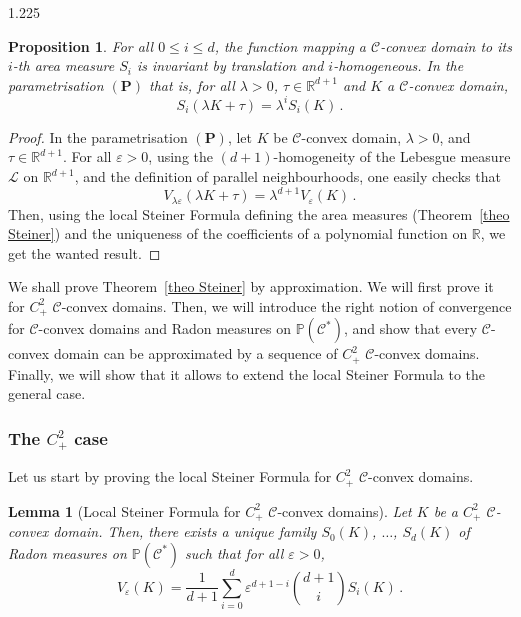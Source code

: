 \documentclass[reqno, a4paper]{amsart}
\numberwithin{equation}{section}
\numberwithin{figure}{section}
\newtheorem{lemma}[theorem]{Lemma}
\newtheorem{proposition}[theorem]{Proposition}
\theoremstyle{definition}
\theoremstyle{remark}
\newcommand{\R}{\mathbb{R}} %
\renewcommand{\P}{\mathbb{P}} %
\newcommand{\C}{\mathcal{C}} %
\begin{document}
\begin{spacing}{1.225}
\begin{proposition}
For all $0\leq i \leq d$, the function mapping a $\C$-convex domain to its $i$-th area measure $S_i$ is invariant by translation and $i$-homogeneous. In the parametrisation $(\mathbf{P})$ that is, for all $\lambda > 0$, $\tau \in \R^{d+1}$ and $K$ a $\C$-convex domain,
\begin{equation*}
S_i(\lambda K + \tau)= \lambda^{i} S_i(K) \, . 
\end{equation*}
\end{proposition}
\begin{proof}
In the parametrisation $(\mathbf{P})$, let $K$ be $\C$-convex domain, $\lambda > 0$, and $\tau \in \R^{d+1}$. For all $\varepsilon>0$, using the $(d+1)$-homogeneity of the Lebesgue measure $\mathcal{L}$ on $\R^{d+1}$, and the definition of parallel neighbourhoods, one easily checks that
\begin{equation*}
    V_{\lambda\varepsilon}(\lambda K + \tau ) =  \lambda^{d+1} V_\varepsilon(K) \, .
\end{equation*}
Then, using the local Steiner Formula defining the area measures (Theorem~\ref{theo Steiner}) and the uniqueness of the coefficients of a polynomial function on $\R$, we get the wanted result.
\end{proof}

We shall prove Theorem~\ref{theo Steiner} by approximation. We will first prove it for $C^2_+$ $\C$-convex domains. Then, we will introduce the right notion of convergence for $\C$-convex domains and Radon measures on $\P(\C^*)$, and show that every $\C$-convex domain can be approximated by a sequence of $C^2_+$ $\C$-convex domains. Finally, we will show that it allows to extend the local Steiner Formula to the general case.

\subsubsection{\texorpdfstring{The $C^2_+$ case}{The C2+ case}} Let us start by proving the local Steiner Formula for $C^2_+$ $\C$-convex domains.

\begin{lemma}[Local Steiner Formula for $C^2_+$ $\C$-convex domains]
\label{lem Steiner formula for C2+}
Let $K$ be a $C^2_+$ $\C$-convex domain. Then, there exists a unique family $S_0(K)$, $\dots$, $S_d(K)$ of Radon measures on $\P(\C^*)$ such that for all $\varepsilon>0$,
\begin{equation*}
V_\varepsilon(K) = \frac{1}{d+1}\sum_{i=0}^{d}\varepsilon^{d+1-i} \binom{d+1}{i} S_i(K) \, .
\end{equation*}
\end{lemma}


\end{spacing}
\end{document}
